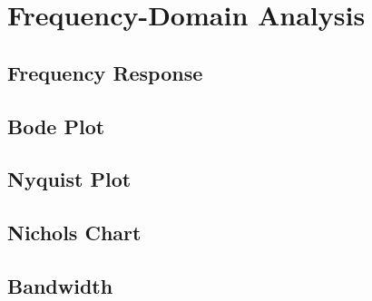 \chapter{Frequency-Domain Analysis} \label{ch:frequency_domain}

    \section{Frequency Response}

    \section{Bode Plot}

    \section{Nyquist Plot}

    \section{Nichols Chart}

    \section{Bandwidth}